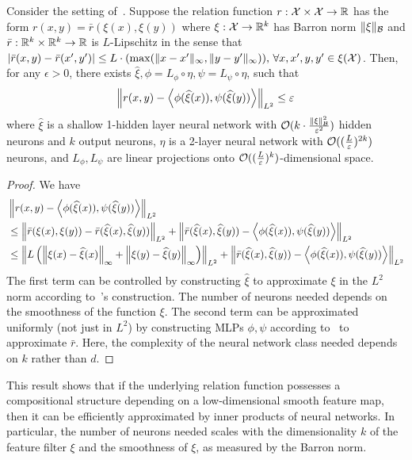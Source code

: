 \begin{corollary}
    Consider the setting of~. Suppose the relation function $r: {\mathcal{X}} \times {\mathcal{X}} \to \mathbb{R}$ has the form $r(x, y) = \bar{r}(\xi(x), \xi(y))$ where $\xi: {\mathcal{X}} \to \mathbb{R}^k$ has Barron norm $\lVert\xi\rVert_{\mathcal{B}}$ and $\bar{r}: \mathbb{R}^k \times \mathbb{R}^k \to \mathbb{R}$ is $L$-Lipschitz in the sense that $\lvert\bar{r}(x, y) - \bar{r}(x', y')\rvert \leq L \cdot (\max(\lVert x - x'\rVert_\infty, \lVert y - y'\rVert_\infty)), \, \forall x,x',y,y' \in \xi({\mathcal{X}})$. Then, for any $\epsilon > 0$, there exists $\hat{\xi}, \phi = L_\phi \circ \eta, \psi = L_\psi \circ \eta$, such that
    \[\left\lVert r(x, y) - \left \langle \phi(\widehat{\xi}(x)), \psi(\widehat{\xi}(y)) \right\rangle\right\rVert_{L^2} \leq \varepsilon\]
    where $\hat{\xi}$ is a shallow 1-hidden layer neural network with ${\mathcal{O}}(k \cdot \frac{\lVert\xi\rVert_{{\mathcal{B}}}^2}{\varepsilon^2})$ hidden neurons and $k$ output neurons, $\eta$ is a 2-layer neural network with ${\mathcal{O}}((\frac{L}{\varepsilon})^{2 k})$ neurons, and $L_\phi, L_\psi$ are linear projections onto ${\mathcal{O}}((\frac{L}{\varepsilon})^{k})$-dimensional space.
\end{corollary}
\begin{proof}
    We have
    \begin{align*}
        &\norm{r(x, y) - \iprod{\phi(\hat{\xi}(x))}{\psi(\hat{\xi}(y))}}_{L^2} \\
        &\leq \norm{\bar{r}(\xi(x), \xi(y)) - \bar{r}(\hat{\xi}(x), \hat{\xi}(y))}_{L^2} + \norm{\bar{r}(\hat{\xi}(x), \hat{\xi}(y)) - \iprod{\phi(\hat{\xi}(x))}{\psi(\hat{\xi}(y))}}_{L^2} \\
        &\leq \norm{L \paren{\infnorm{\xi(x) - \hat{\xi}(x)} + \infnorm{\xi(y) - \hat{\xi}(y)}}}_{L^2} + \norm{\bar{r}(\hat{\xi}(x), \hat{\xi}(y)) - \iprod{\phi(\hat{\xi}(x))}{\psi(\hat{\xi}(y))}}_{L^2}
    \end{align*}
    The first term can be controlled by constructing $\hat{\xi}$ to approximate $\xi$ in the $L^2$ norm according to~\textcite{barronUniversalApproximation1993}'s construction. The number of neurons needed depends on the smoothness of the function $\xi$. The second term can be approximated uniformly (not just in $L^2$) by constructing MLPs $\phi, \psi$ according to~ to approximate $\bar{r}$. Here, the complexity of the neural network class needed depends on $k$ rather than $d$.
\end{proof}

This result shows that if the underlying relation function possesses a compositional structure depending on a low-dimensional smooth feature map, then it can be efficiently approximated by inner products of neural networks. In particular, the number of neurons needed scales with the dimensionality $k$ of the feature filter $\xi$ and the smoothness of $\xi$, as measured by the Barron norm.